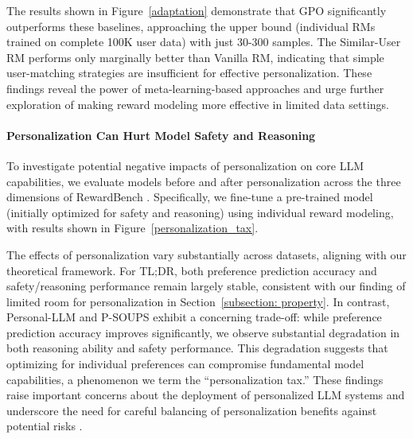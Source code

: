 The results shown in Figure~\ref{adaptation} demonstrate that GPO significantly outperforms these baselines, approaching the upper bound (individual RMs trained on complete 100K user data) with just 30-300 samples. The Similar-User RM performs only marginally better than Vanilla RM, indicating that simple user-matching strategies are insufficient for effective personalization. These findings reveal the power of meta-learning-based approaches and urge further exploration of making reward modeling more effective in limited data settings.

\paragraph{Personalization Can Hurt Model Safety and Reasoning} 
\label{sec: safety}
To investigate potential negative impacts of personalization on core LLM capabilities, we evaluate models before and after personalization across the three dimensions of RewardBench \citep{lambert2024rewardbench}. Specifically, we fine-tune a pre-trained model (initially optimized for safety and reasoning) using individual reward modeling, with results shown in Figure~\ref{personalization_tax}.

The effects of personalization vary substantially across datasets, aligning with our theoretical framework. For TL;DR, both preference prediction accuracy and safety/reasoning performance remain largely stable, consistent with our finding of limited room for personalization in Section~\ref{subsection: property}. In contrast, Personal-LLM and P-SOUPS exhibit a concerning trade-off: while preference prediction accuracy improves significantly, we observe substantial degradation in both reasoning ability and safety performance. This degradation suggests that optimizing for individual preferences can compromise fundamental model capabilities, a phenomenon we term the ``personalization tax.'' These findings raise important concerns about the deployment of personalized LLM systems and underscore the need for careful balancing of personalization benefits against potential risks \citep{kirk2024benefits, hui2024toxi, ai2024de}.



